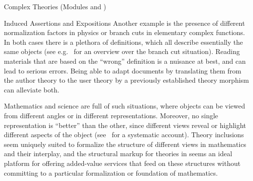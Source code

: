 \begin{tchapter}[id=complex-theories,short=Complex Theories]{Complex Theories (Modules
     and )}
\begin{tsection}[id=induced-assertions,short=Induced Assertions]{Induced Assertions and Expositions}
Another example is the presence of different normalization factors in physics or branch
cuts in elementary complex functions. In both cases there is a plethora of definitions,
which all describe essentially the same objects (see e.g.~\cite{BraCor:raefca02} for an
overview over the branch cut situation). Reading materials that are based on the ``wrong''
definition is a nuisance at best, and can lead to serious errors. Being able to adapt
documents by translating them from the author theory to the user theory by a previously
established theory morphism can alleviate both.

Mathematics and science are full of such situations, where objects can be viewed from
different angles or in different representations. Moreover, no single representation is
``better'' than the other, since different views reveal or highlight different aspects of
the object (see~\cite{KohKoh:esmk05} for a systematic account). Theory inclusions seem
uniquely suited to formalize the structure of different views in mathematics and their
interplay, and the structural markup for theories in \omdoc seems an ideal platform for
offering added-value services that feed on these structures without committing to a
particular formalization or foundation of mathematics.
\end{tsection}

\end{tchapter}

